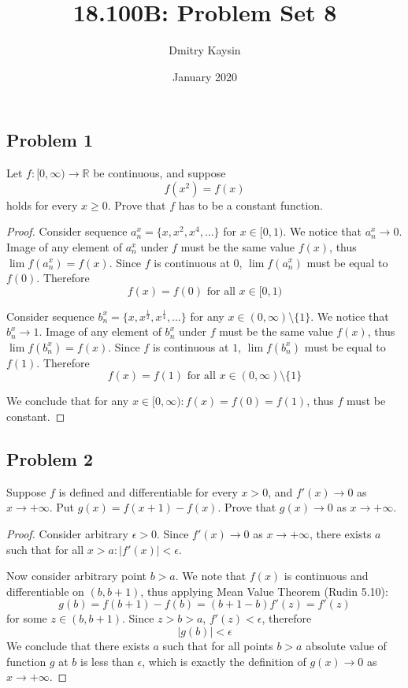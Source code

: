 \documentclass{article}
\title{18.100B: Problem Set 8}
\author{Dmitry Kaysin}
\date{January 2020}
\newcommand{\R}{\mathbb{R}}
\begin{document}
\maketitle 

\subsection*{Problem 1}

\begin{tcolorbox}
Let $f : [0, \infty) \to \R$ be continuous, and suppose
\[ f(x^2) = f(x) \]
holds for every $x \geq 0$.
Prove that $f$ has to be a constant function.
\end{tcolorbox}

\begin{proof}

Consider sequence $a^x_n = \{ x, x^2, x^4, \dots \}$ for $x \in [0, 1)$.
We notice that $a^x_n \to 0$.
Image of any element of $a^x_n$ under $f$ must be the same value $f(x)$, thus $\lim f(a^x_n) = f(x)$.
Since $f$ is continuous at $0$,  $\lim f(a^x_n)$ must be equal to $f(0)$. Therefore
\[ f(x) = f(0) \text{ for all } x \in [0, 1) \]

Consider sequence $b^x_n = \{ x, x^{\frac{1}{2}}, x^{\frac{1}{4}}, \dots \}$ for any $x \in (0, \infty) \setminus \{1\}$.
We notice that $b^x_n \to 1$.
Image of any element of $b^x_n$ under $f$ must be the same value $f(x)$, thus $\lim f(b^x_n) = f(x)$.
Since $f$ is continuous at $1$,  $\lim f(b^x_n)$ must be equal to $f(1)$. 
Therefore
\[ f(x) = f(1) \text{ for all } x \in (0, \infty) \setminus \{1\} \]

We conclude that for any $x \in [0, \infty) : f(x) = f(0) = f(1)$, thus $f$ must be constant.

\end{proof}


\subsection*{Problem 2}

\begin{tcolorbox}
Suppose $f$ is defined and differentiable for every $x > 0$, and $f'(x) \to 0$ as $x \to + \infty$.
Put $g(x) = f(x+1) - f(x)$.
Prove that $g(x) \to 0$ as $x \to +\infty$.
\end{tcolorbox}

\begin{proof}

Consider arbitrary $\epsilon>0$.
Since $f'(x) \to 0$ as $x\to +\infty$, there exists $a$ such that for all $x>a : | f'(x)| < \epsilon$.

Now consider arbitrary point $b > a$.
We note that $f(x)$ is continuous and differentiable on $(b,b+1)$, thus applying Mean Value Theorem (Rudin 5.10):
\[ g(b) = f(b+1) - f(b) = (b+1-b) f'(z) = f'(z) \]
for some $z \in (b,b+1)$.
Since $z > b > a$, $f'(z) < \epsilon$, therefore
\[ | g(b) | < \epsilon \]
We conclude that there exists $a$ such that for all points $b>a$ absolute value of function $g$ at $b$ is less than $\epsilon$, which is exactly the definition of $g(x) \to 0$ as $x \to +\infty$.

\end{proof}
\end{document}

